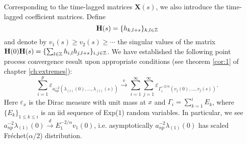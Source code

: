 Corresponding to the time-lagged matrices $\mathbf X(s)$, we also introduce
the time-lagged coefficient matrices. Define
\[
\mathbf H(s) = \{h_{k, l+s}\}_{k, l \in \mathbb Z}
\]
and denote by $v_1(s) \geq v_2(s) \geq \cdots$ the singular values of
the matrix
$\mathbf H(0) \mathbf H(s) = \{\sum_{l \in \mathbb Z} h_{i,l} h_{j,l+s}\}_{i,j \in \mathbb Z}$.
We have established the following point process convergence result
upon appropriate conditions (see theorem \ref{cor:1} of chapter
\ref{ch:extremes}):
\[
\sum_{i=1}^p \varepsilon_{a_{np}^{-2}(\lambda_{(i)}(0), \ldots, \lambda_{(i)}(s))}
\overset{v}{\to}
\sum_{i=1}^\infty \sum_{j=1}^\infty
\varepsilon_{\Gamma_i^{-2/\alpha}(v_j(0), \ldots, v_j(s))}.
\]
Here $\varepsilon_{x}$ is the Dirac measure with unit mass at $x$ and
$\Gamma_i = \sum_{k=1}^i E_k$, where $\{E_k\}_{1 \leq k \leq i}$ is
an iid sequence of Exp($1$) random variables. In particular, we see
$a_{np}^{-2}\lambda_{(1)}(0) \overset{d}{\to} E_1^{-2/\alpha} v_1(0)$, i.e.
asymptotically $a_{np}^{-2}\lambda_{(1)}(0)$ has scaled
Fréchet($\alpha/2$) distribution.



